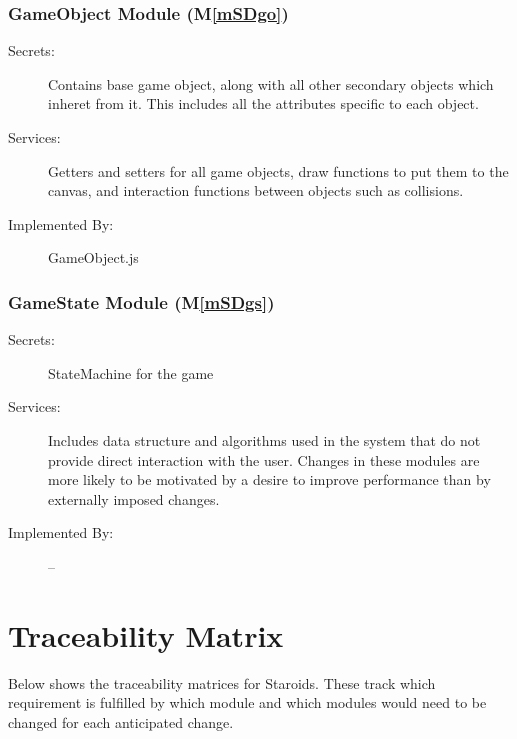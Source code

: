 \documentclass[12pt, titlepage]{article}
\newcommand{\mref}[1]{M\ref{#1}}
\begin{document}
\subsubsection{GameObject Module (\mref{mSDgo})}
\begin{description}
\item[Secrets:] Contains base game object, along with all other secondary objects which inheret from it. This includes all the attributes specific to each object.
\item[Services:] Getters and setters for all game objects, draw functions to put them to the canvas, and interaction functions between objects such as collisions.
\item[Implemented By:] GameObject.js
\end{description}

\subsubsection{GameState Module (\mref{mSDgs})}
\begin{description}
\item[Secrets:] StateMachine for the game
\item[Services:] Includes data structure and algorithms used in the system that
  do not provide direct interaction with the user.
   Changes in these modules are more likely to be motivated by a desire to
   improve performance than by externally imposed changes.
\item[Implemented By:] --
\end{description}

\section{Traceability Matrix} \label{SecTM}

Below shows the traceability matrices for Staroids. These track which requirement is fulfilled by which module and which modules would need to be changed for each anticipated change.
\end{document}
